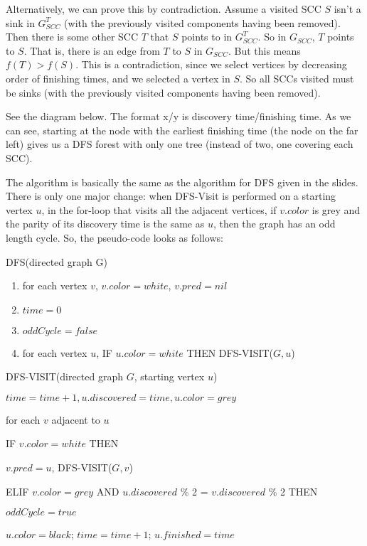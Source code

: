 \documentclass{article}
\begin{document}
\begin{description}
        Alternatively, we can prove this by contradiction.
        Assume a visited SCC $S$ isn't a sink in $G^T_{SCC}$ (with the
        previously visited components having been removed). Then there is
        some other SCC $T$ that $S$ points to in $G^T_{SCC}$. So in $G_{SCC}$,
        $T$ points to $S$. That is, there is an edge from $T$ to $S$ in
        $G_{SCC}$. But this means $f(T) > f(S)$. This is a contradiction, since
        we select vertices by decreasing order of finishing times, and we
        selected a vertex in $S$. So all SCCs
        visited must be sinks (with the previously visited components having
        been removed).
    \item[(c)]
        See the diagram below. The format x/y is discovery time/finishing time.
        As we can see, starting at the node with the earliest finishing time
        (the node on the far left) gives us a DFS forest with only one tree
        (instead of two, one covering each SCC).
        \vspace{50mm}
    \item[(d)]
        The algorithm is basically the same as the algorithm for DFS given in
        the slides. There is only one major change: when DFS-Visit is performed
        on a starting vertex $u$, in the for-loop that visits all the adjacent
        vertices, if $v.color$ is grey and the
        parity of its discovery time is the same as $u$, then the graph has an
        odd length cycle. So, the pseudo-code looks as follows:

        DFS(directed graph G)
        \begin{enumerate}
            \item for each vertex $v$, $v.color = white$, $v.pred = nil$
            \item $time = 0$
                \item $oddCycle = false$
            \item for each vertex $u$, IF $u.color = white$ THEN DFS-VISIT($G, u$)
        \end{enumerate}
        DFS-VISIT(directed graph $G$, starting vertex $u$)
        \begin{enumerate}
            \item $time = time +1, u.discovered = time, u.color = grey$
            \item for each $v$ adjacent to $u$
            {\setlength\itemindent{25pt} \item IF $v.color = white$ THEN}
            {\setlength\itemindent{50pt} \item $v.pred = u$, DFS-VISIT($G, v$)}
            {\setlength\itemindent{25pt} \item ELIF $v.color = grey$ AND
                $u.discovered$ \% 2 = $v.discovered$ \% 2 THEN}
            {\setlength\itemindent{50pt} \item $oddCycle = true$}
            \item $u.color = black$; $time = time + 1$; $u.finished = time$
        \end{enumerate}


\end{description}
\end{document}
